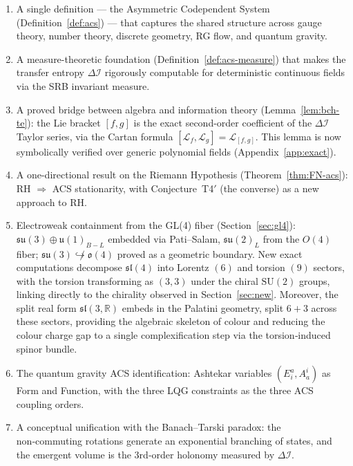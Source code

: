 \documentclass[12pt,a4paper]{article}
\theoremstyle{plain}
\theoremstyle{definition}
\theoremstyle{remark}
\newcommand{\DI}{\Delta\mathcal{I}}
\begin{document}
\begin{enumerate}[label=(\roman*)]
\item A single definition --- the Asymmetric Codependent System
  (Definition~\ref{def:acs}) --- that captures the shared structure across
  gauge theory, number theory, discrete geometry, RG flow, and quantum gravity.
\item A measure-theoretic foundation (Definition~\ref{def:acs-measure}) that makes
  the transfer entropy $\DI$ rigorously computable for deterministic continuous
  fields via the SRB invariant measure.
\item A proved bridge between algebra and information theory
  (Lemma~\ref{lem:bch-te}): the Lie bracket $[f,g]$ is the exact
  second-order coefficient of the $\DI$ Taylor series, via the Cartan
  formula $[\mathcal{L}_f,\mathcal{L}_g]=\mathcal{L}_{[f,g]}$.
  This lemma is now symbolically verified over generic polynomial fields
  (Appendix~\ref{app:exact}).
\item A one-directional result on the Riemann Hypothesis
  (Theorem~\ref{thm:FN-acs}): RH $\Rightarrow$ ACS stationarity,
  with Conjecture~T4$'$ (the converse) as a new approach to RH.
\item Electroweak containment from the GL(4) fiber
  (Section~\ref{sec:gl4}): $\mathfrak{su}(3)\oplus\mathfrak{u}(1)_{B-L}$ embedded
  via Pati--Salam, $\mathfrak{su}(2)_L$ from the $O(4)$ fiber;
  $\mathfrak{su}(3)\not\hookrightarrow\mathfrak{o}(4)$
  proved as a geometric boundary.  New exact computations decompose
  $\mathfrak{sl}(4)$ into Lorentz $(6)$ and torsion $(9)$ sectors,
  with the torsion transforming as $(3,3)$ under the chiral $\mathrm{SU}(2)$
  groups, linking directly to the chirality observed in Section~\ref{sec:new}.
  Moreover, the split real form $\mathfrak{sl}(3,\mathbb{R})$ embeds in the
  Palatini geometry, split $6+3$ across these sectors, providing the algebraic
  skeleton of colour and reducing the colour charge gap to a single
  complexification step via the torsion‑induced spinor bundle.
\item The quantum gravity ACS identification: Ashtekar variables
  $(E^a_i, A^i_a)$ as Form and Function, with the three LQG constraints
  as the three ACS coupling orders.
\item A conceptual unification with the Banach–Tarski paradox:
  the non‑commuting rotations generate an exponential branching of states,
  and the emergent volume is the 3rd‑order holonomy measured by $\DI$.
\end{enumerate}
\end{document}
